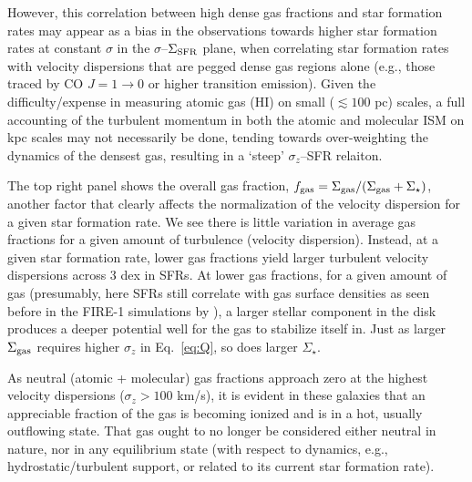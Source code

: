 \documentclass[usletter,fleqn,usenatbib]{mnras}
\begin{document}
However, this correlation between high dense gas fractions and star formation rates may appear as a bias in the observations towards higher star formation rates at constant $\sigma$ in the $\sigma$--$\Sigma_{\rm SFR}$ plane, when correlating star formation rates with velocity dispersions that are pegged dense gas regions alone (e.g., those traced by CO $J = 1 \rightarrow 0$ or higher transition emission).  Given the difficulty/expense in measuring atomic gas (H{\scriptsize I}) on small ($\lesssim 100$ pc) scales, a full accounting of the turbulent momentum in both the atomic and molecular ISM on kpc scales may not necessarily be done, tending towards over-weighting the dynamics of the densest gas, resulting in a `steep' $\sigma_z$--SFR relaiton.  

The top right panel shows the overall gas fraction, $f_{\rm gas} = \Sigma_{\rm gas}/(\Sigma_{\rm gas} + \Sigma_\star)$, another factor that clearly affects the normalization of the velocity dispersion for a given star formation rate.  We see there is little variation in average gas fractions for a given amount of turbulence (velocity dispersion). Instead, at a given star formation rate, lower gas fractions yield larger turbulent velocity dispersions across 3 dex in SFRs.  At lower gas fractions, for a given amount of gas (presumably, here SFRs still correlate with gas surface densities as seen before in the FIRE-1 simulations by \citealt{Orr2018}), a larger stellar component in the disk produces a deeper potential well for the gas to stabilize itself in.  Just as larger $\Sigma_{\rm gas}$ requires higher $\sigma_z$ in Eq.~\ref{eq:Q}, so does larger $\Sigma_\star$.

As neutral (atomic + molecular) gas fractions approach zero at the highest velocity dispersions ($\sigma_z > 100$ km/s), it is evident in these galaxies that an appreciable fraction of the gas is becoming ionized and is in a hot, usually outflowing state.  That gas ought to no longer be considered either neutral in nature, nor in any equilibrium state (with respect to dynamics, e.g., hydrostatic/turbulent support, or related to its current star formation rate).
\end{document}
